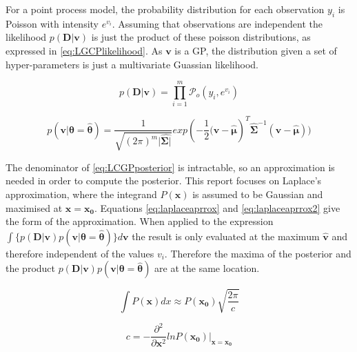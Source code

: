 \documentclass[a4paper,11pt]{report}
\begin{document}
\doublespacing

For a point process model, the probability distribution for each observation \(y_i\) is Poisson with intensity \(e^{v_i}\). Assuming that observations are independent the likelihood \(p(\mathbf{D|v})\) is just the product of these poisson distributions, as expressed in \ref{eq:LGCPlikelihood}. As \(\mathbf{v}\) is a GP, the distribution given a set of hyper-parameters is just a multivariate Guassian likelihood. 

\singlespacing

\begin{equation} \label{eq:LGCPlikelihood}
p(\mathbf{D|v}) = \prod_{i=1}^{m} \mathcal{P}_o (y_i, e^{v_i})
\end{equation}

\begin{equation}
p(\mathbf{v}|\boldsymbol{\theta}=\hat{\boldsymbol{\theta}}) = \frac{1}{\sqrt{(2\pi)^{m} |\hat{\boldsymbol{\Sigma|}}}} exp(- \frac{1}{2} \mathbf{(v}-\hat{\boldsymbol{\mu}})^{T}\hat{\boldsymbol{\Sigma}}^{-1}(\mathbf{v}-\hat{\boldsymbol{\mu}}))
\end{equation}

\doublespacing

The denominator of \ref{eq:LCGPposterior} is intractable, so an approximation is needed in order to compute the posterior. This report focuses on Laplace's approximation, where the integrand \(P(\mathbf{x})\) is assumed to be Gaussian and maximised at \(\mathbf{x=x_0}\). Equations \ref{eq:laplaceaprrox} and \ref{eq:laplaceaprrox2} give the form of the approximation. \cite{Mackay} When applied to the expression \(\int{\{p(\mathbf{D|v}) p(\mathbf{v}|\boldsymbol{\theta}=\hat{\boldsymbol{\theta}})\} d\mathbf{v}} \) the result is only evaluated at the maximum \(\hat{\mathbf{v}}\) and therefore independent of the values \(v_i\). Therefore the maxima of the posterior and the product \(p(\mathbf{D|v}) p(\mathbf{v}|\boldsymbol{\theta}=\hat{\boldsymbol{\theta}})\) are at the same location.

\singlespacing

\begin{equation} \label{eq:laplaceaprrox}
\int{P(\mathbf{x}) dx} \approx P(\mathbf{x_0}) \sqrt{\frac{2\pi}{c}}
\end{equation} 

\begin{equation} \label{eq:laplaceaprrox2}
c = - \frac{\partial^2}{\partial \mathbf{x}^2} ln P(\mathbf{x_0}) |_{\mathbf{x}=\mathbf{x_0}}
\end{equation}
\end{document}
